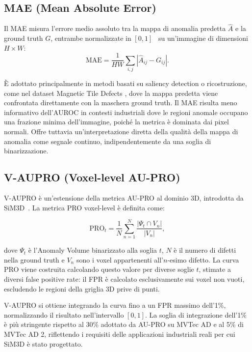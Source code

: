 \subsection{MAE (Mean Absolute Error)}
\label{subsec:mae}

Il MAE misura l'errore medio assoluto tra la mappa di anomalia predetta $\hat{A}$ e la ground truth $G$, entrambe normalizzate in $[0,1]$~\cite{borji2015salient} su un'immagine di dimensioni $H \times W$:
\[
  \mathrm{MAE} = \frac{1}{HW}\sum_{i,j}|\hat{A}_{ij} - G_{ij}|.
\]

È adottato principalmente in metodi basati su saliency detection o ri\-co\-stru\-zio\-ne, come nel dataset Magnetic Tile Defects \cite{huang2018surface}, dove la mappa predetta viene confrontata direttamente con la maschera ground truth. Il MAE risulta meno informativo dell'AUROC in contesti industriali dove le regioni anomale occupano una frazione minima dell'immagine, poiché la metrica è dominata dai pixel normali. Offre tuttavia un'interpretazione diretta della qualità della mappa di anomalia come segnale continuo, indipendentemente da una soglia di binarizzazione.

\subsection{V-AUPRO (Voxel-level AU-PRO)}
\label{subsec:vaupro}

V-AUPRO è un'estensione della metrica AU-PRO al dominio 3D, introdotta da SiM3D~\cite{sim3d2025}. La metrica PRO voxel-level è definita come:

\[
  \mathrm{PRO}_t = \frac{1}{N}\sum_{n=1}^{N}\frac{|\Psi_t \cap V_n|}{|V_n|},
\]

dove $\Psi_t$ è l'Anomaly Volume binarizzato alla soglia $t$, $N$ è il numero di difetti nella ground truth e $V_n$ sono i voxel appartenenti all'$n$-esimo difetto. La curva PRO viene costruita calcolando questo valore per diverse soglie $t$, stimate a diversi false positive rate: il FPR è calcolato esclusivamente sui voxel non vuoti, escludendo le regioni della griglia 3D prive di punti.

V-AUPRO si ottiene integrando la curva fino a un FPR massimo dell'1\%, normalizzando il risultato nell'intervallo $[0,1]$. La soglia di integrazione dell'1\% è più stringente rispetto al 30\% adottato da AU-PRO su MVTec AD e al 5\% di MVTec AD 2, riflettendo i requisiti delle applicazioni industriali reali per cui SiM3D è stato progettato.

